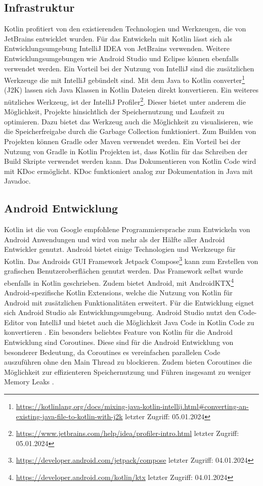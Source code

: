 \documentclass{article}
\begin{document}
\subsection{Infrastruktur}
Kotlin profitiert von den existierenden Technologien und Werkzeugen, die von JetBrains entwicklet wurden. Für das Entwickeln mit Kotlin lässt sich als Entwicklungsumgebung IntelliJ IDEA von JetBrains verwenden. Weitere Entwicklungsumgebungen wie Android Studio und Eclipse können ebenfalls verwendet werden. Ein Vorteil bei der Nutzung von IntelliJ sind die zusätzlichen Werkzeuge die mit IntelliJ gebündelt sind. Mit dem Java to Kotlin converter\footnote{\url{https://kotlinlang.org/docs/mixing-java-kotlin-intellij.html#converting-an-existing-java-file-to-kotlin-with-j2k} letzter Zugriff: 05.01.2024} (J2K) lassen sich Java Klassen in Kotlin Dateien direkt konvertieren. Ein weiteres nützliches Werkzeug, ist der IntelliJ Profiler\footnote{\url{https://www.jetbrains.com/help/idea/profiler-intro.html} letzter Zugriff: 05.01.2024}. Dieser bietet unter anderem die Möglichkeit, Projekte hinsichtlich der Speichernutzung und Laufzeit zu optimieren. Dazu bietet das Werkzeug auch die Möglichkeit zu visualisieren, wie die Speicherfreigabe durch die Garbage Collection funktioniert. \newline
Zum Builden von Projekten können Gradle oder Maven verwendet werden. Ein Vorteil bei der Nutzung von Gradle in Kotlin Projekten ist, dass Kotlin für das Schreiben der Build Skripte verwendet werden kann. Das Dokumentieren von Kotlin Code wird mit KDoc ermöglicht. KDoc funktioniert analog zur Dokumentation in Java mit Javadoc.

\subsection{Android Entwicklung}
Kotlin ist die von Google empfohlene Programmiersprache zum Entwickeln von Android Anwendungen und wird von mehr als der Hälfte aller Android Entwickler genutzt. Android bietet einige Technologien und Werkzeuge für Kotlin. Das Androids GUI Framework Jetpack Compose\footnote{\url{https://developer.android.com/jetpack/compose} letzter Zugriff: 04.01.2024} kann zum Erstellen von grafischen Benutzeroberflächen genutzt werden. Das Framework selbst wurde ebenfalls in Kotlin geschrieben. Zudem bietet Android, mit AndroidKTX\footnote{\url{https://developer.android.com/kotlin/ktx} letzter Zugriff: 04.01.2024} Android-spezifische Kotlin Extensions, welche die Nutzung von Kotlin für Android mit zusätzlichen Funktionalitäten erweitert. Für die Entwicklung eignet sich Android Studio als Entwicklungsumgebung. Android Studio nutzt den Code-Editor von IntelliJ und bietet auch die Möglichkeit Java Code in Kotlin Code zu konvertieren \cite{AndroidKotlin}. \newline
Ein besonders beliebtes Feature von Kotlin für die Android Entwicklung sind Coroutines. Diese sind für die Android Entwicklung von besonderer Bedeutung, da Coroutines es vereinfachen parallelen Code auszuführen ohne den Main Thread zu blockieren. Zudem bieten Coroutines die Möglichkeit zur effizienteren Speichernutzung und Führen insgesamt zu weniger Memory Leaks \cite{AndroidCoroutine}.
\end{document}

